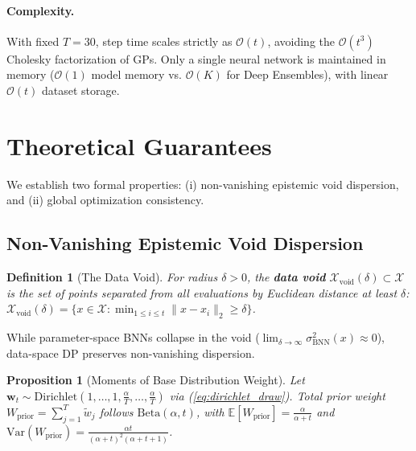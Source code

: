 \documentclass{article}
\newtheorem{definition}{Definition}
\newtheorem{proposition}{Proposition}
\begin{document}
\paragraph{Complexity.} With fixed $T=30$, step time scales strictly as $\mathcal{O}(t)$, avoiding the $\mathcal{O}(t^3)$ Cholesky factorization of GPs. Only a single neural network is maintained in memory ($\mathcal{O}(1)$ model memory vs. $\mathcal{O}(K)$ for Deep Ensembles), with linear $\mathcal{O}(t)$ dataset storage.

\section{Theoretical Guarantees}
\label{sec:theory}
We establish two formal properties: (i) non-vanishing epistemic void dispersion, and (ii) global optimization consistency.

\subsection{Non-Vanishing Epistemic Void Dispersion}
\begin{definition}[The Data Void]
\label{def:data_void}
For radius $\delta > 0$, the \textbf{data void} $\mathcal{X}_{\mathrm{void}}(\delta) \subset \mathcal{X}$ is the set of points separated from all evaluations by Euclidean distance at least $\delta$: $\mathcal{X}_{\mathrm{void}}(\delta) = \{ x \in \mathcal{X} : \min_{1 \le i \le t} \|x - x_i\|_2 \ge \delta \}$.
\end{definition}

While parameter-space BNNs collapse in the void ($\lim_{\delta \to \infty} \sigma_{\mathrm{BNN}}^2(x) \approx 0$), data-space DP preserves non-vanishing dispersion.

\begin{proposition}[Moments of Base Distribution Weight]
\label{prop:dirichlet_moments}
Let $\mathbf{w}_t \sim \mathrm{Dirichlet}(1, \dots, 1, \frac{\alpha}{T}, \dots, \frac{\alpha}{T})$ via (\ref{eq:dirichlet_draw}). Total prior weight $W_{\mathrm{prior}} = \sum_{j=1}^T \widetilde{w}_j$ follows $\mathrm{Beta}(\alpha, t)$, with $\mathbb{E}[W_{\mathrm{prior}}] = \frac{\alpha}{\alpha + t}$ and $\mathrm{Var}(W_{\mathrm{prior}}) = \frac{\alpha t}{(\alpha + t)^2 (\alpha + t + 1)}$.
\end{proposition}
\end{document}
